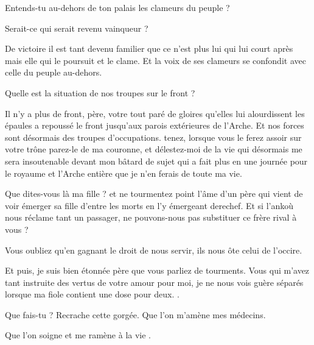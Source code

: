 \begin{drama}
  \elaspeaks Entends-tu au-dehors de ton palais les clameurs du peuple ?

  \roispeaks Serait-ce \elena qui serait revenu vainqueur ?

  \elaspeaks De victoire il est tant devenu familier que ce n’est plus lui qui lui court après mais elle qui le poursuit et le clame. Et la voix de ses clameurs se confondit avec celle du peuple au-dehors.

  \roispeaks Quelle est la situation de nos troupes sur le front ?

  \elaspeaks Il n’y a plus de front, père, votre \elena tout paré de gloires qu’elles lui alourdissent les épaules a repoussé le front jusqu’aux parois extérieures de l’Arche. Et nos forces sont désormais des troupes d’occupations.  tenez, lorsque vous le ferez assoir sur votre trône parez-le de ma couronne, et délestez-moi de la vie qui désormais me sera insoutenable devant mon bâtard de sujet qui a fait plus en une journée pour le royaume et l’Arche entière que je n’en ferais de toute ma vie.

  \roispeaks Que dites-vous là ma fille ? et ne tourmentez point l’âme d’un père qui vient de voir émerger sa fille d’entre les morts en l’y émergeant derechef. Et si l’ankoù nous réclame tant un passager, ne pouvons-nous pas substituer ce frère rival à vous ?

  \elaspeaks Vous oubliez qu’en gagnant le droit de nous servir, ils nous ôte celui de l’occire.

  Et puis, je suis bien étonnée père que vous parliez de tourments. Vous qui m’avez tant instruite des vertus de votre amour pour moi, je ne nous vois guère séparés lorsque ma fiole contient une dose pour deux. .

  \roispeaks Que fais-tu \princesse{} ? Recrache cette gorgée.  Que l’on m’amène mes médecins.


  \roispeaks Que l’on soigne et me ramène à la vie \princesse.





\end{drama}
